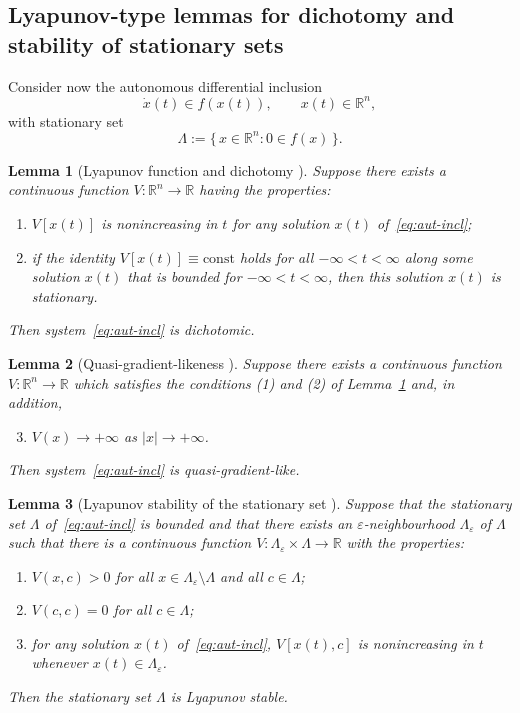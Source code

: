 \documentclass[journal]{IEEEtran}
\newtheorem{lemma}{Lemma}
\begin{document}
\subsection{Lyapunov-type lemmas for dichotomy and stability of stationary sets}

Consider now the autonomous differential inclusion
\begin{equation}\label{eq:aut-incl}
   \dot x(t) \in f(x(t)), \qquad x(t)\in\mathbb{R}^n,
\end{equation}
with stationary set
\[
   \Lambda := \{\,x\in\mathbb{R}^n : 0\in f(x)\,\}.
\]

\begin{lemma}[Lyapunov function and dichotomy {\cite[Lem.~1.4]{YLG}}]\label{lem:YLGl1-4}
Suppose there exists a continuous function $V:\mathbb{R}^n\to\mathbb{R}$
having the properties:
\begin{enumerate}
  \item $V[x(t)]$ is nonincreasing in $t$ for any solution $x(t)$
        of~\eqref{eq:aut-incl};
  \item if the identity $V[x(t)]\equiv\mathrm{const}$ holds for all
        $-\infty<t<\infty$ along some solution $x(t)$ that is bounded
        for $-\infty<t<\infty$, then this solution $x(t)$ is stationary.
\end{enumerate}
Then system~\eqref{eq:aut-incl} is dichotomic.
\end{lemma}

\begin{lemma}[Quasi-gradient-likeness {\cite[Lem.~1.5]{YLG}}]\label{lem:YLGl1-5}
Suppose there exists a continuous function $V:\mathbb{R}^n\to\mathbb{R}$
which satisfies the conditions \emph{(1)} and \emph{(2)} of
Lemma~\ref{lem:YLGl1-4} and, in addition,
\begin{enumerate}
  \setcounter{enumi}{2}
  \item $V(x)\to +\infty$ as $|x|\to +\infty$.
\end{enumerate}
Then system~\eqref{eq:aut-incl} is quasi-gradient-like.
\end{lemma}

\begin{lemma}[Lyapunov stability of the stationary set {\cite[Lem.~1.6]{YLG}}]\label{lem:YLGl1-6}
Suppose that the stationary set $\Lambda$ of~\eqref{eq:aut-incl} is
bounded and that there exists an $\varepsilon$-neighbourhood
$\Lambda_\varepsilon$ of $\Lambda$ such that there is a continuous
function $V:\Lambda_\varepsilon\times\Lambda\to\mathbb{R}$ with the
properties:
\begin{enumerate}
  \item $V(x,c)>0$ for all $x\in\Lambda_\varepsilon\setminus\Lambda$ and
        all $c\in\Lambda$;
  \item $V(c,c)=0$ for all $c\in\Lambda$;
  \item for any solution $x(t)$ of~\eqref{eq:aut-incl},
        $V[x(t),c]$ is nonincreasing in $t$ whenever $x(t)\in\Lambda_\varepsilon$.
\end{enumerate}
Then the stationary set $\Lambda$ is Lyapunov stable.
\end{lemma}
\end{document}
